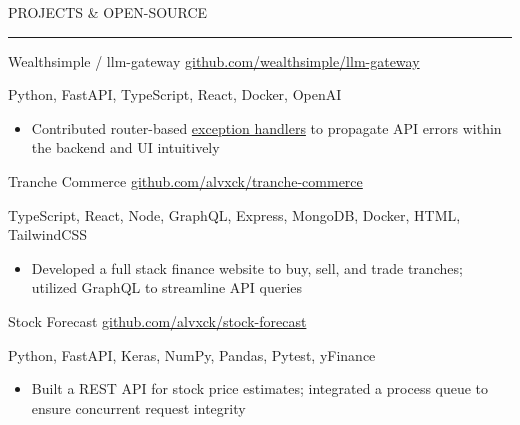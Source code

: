 \documentclass[9pt]{extarticle}
\begin{document}

\begin{adjustwidth}{4pt}{4pt} PROJECTS \& OPEN-SOURCE \end{adjustwidth}
\rule[8pt]{\linewidth}{0.4pt}

\begin{adjustwidth}{14pt}{14pt}
	Wealthsimple / llm-gateway \hfill \href{https://github.com/wealthsimple/llm-gateway}{github.com/wealthsimple/llm-gateway}
	
	Python, FastAPI, TypeScript, React, Docker, OpenAI
	
	\begin{itemize}
		\item Contributed router-based \href{https://github.com/wealthsimple/llm-gateway/pull/27}{exception handlers} to propagate API errors within the backend and UI intuitively
	\end{itemize}
	
	Tranche Commerce \hfill \href{https://github.com/alvxck/tranche-commerce}{github.com/alvxck/tranche-commerce}
	
	TypeScript, React, Node, GraphQL, Express, MongoDB, Docker, HTML, TailwindCSS
	
	\begin{itemize}
		\item Developed a full stack finance website to buy, sell, and trade tranches; utilized GraphQL to streamline API queries
	\end{itemize}
	
	Stock Forecast \hfill \href{https://github.com/alvxck/stock-forecast}{github.com/alvxck/stock-forecast}
	
	Python, FastAPI, Keras, NumPy, Pandas, Pytest, yFinance
	
	\begin{itemize}
		\item Built a REST API for stock price estimates; integrated a process queue to ensure concurrent request integrity
	\end{itemize}
\end{adjustwidth}
\end{document}

